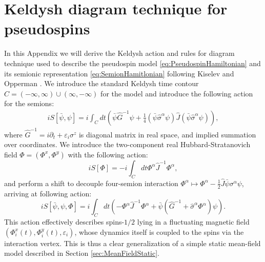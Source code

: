 \documentclass[twocolumn,english,prb]{revtex4-1}
\begin{document}
\section{Keldysh diagram technique for pseudospins}
\label{sec:AppendixKeldysh}
In this Appendix we will derive the Keldysh action and rules for diagram technique used to describe the pseudospin model \eqref{eq:PseudospinHamiltonian} and its semionic representation \eqref{eq:SemionHamitlonian} following Kiselev and Opperman \cite{KiselevOppermann}. We introduce the standard Keldysh time contour $C = (-\infty,\infty)\cup(\infty,-\infty)$ for the model and introduce the following action for the semions:
\begin{multline}
i S[\bar{\psi}, \psi] = i\int_C dt \left(\bar{\psi}\hat{G}^{-1}\psi+\frac{1}{4}(\bar{\psi}\hat{\sigma}^{\alpha}\psi)\hat{J}(\bar{\psi}\hat{\sigma}^{\alpha}\psi)\right),
\end{multline}
where $\hat{G}^{-1}=i\partial_{t}+\varepsilon_{i}\sigma^{z}$ is diagonal matrix in real space, and implied summation over coordinates. We introduce the two-component real Hubbard-Stratanovich field $\Phi = (\Phi^x, \Phi^y)$ with the following action:
\begin{equation}
iS[\Phi]=-i\int_{C}dt\Phi^{\alpha}\hat{J}^{-1}\Phi^{\alpha},
\end{equation}
and perform a shift to decouple four-semion interaction $\Phi^{\alpha}\mapsto\Phi^{\alpha}-\frac{1}{2}\hat{J}\bar{\psi}\sigma^{\alpha}\psi$, arriving at following action:
\begin{equation}
iS[\bar{\psi}, \psi, \Phi] = i\int_C dt\left(-\Phi^{\alpha}\hat{J}^{-1}\Phi^{\alpha}+\bar{\psi}(\hat{G}^{-1}+\hat{\sigma}^{\alpha}\Phi^{\alpha})\psi\right).
\end{equation}
This action effectively describes spins-$1/2$ lying in a fluctuating magnetic field $(\Phi_i^x(t), \Phi_i^y(t), \varepsilon_i)$, whose dynamics itself is coupled to the spins via the interaction vertex. This is thus a clear generalization of a simple static mean-field model described in Section \ref{sec:MeanFieldStatic}.
\end{document}
